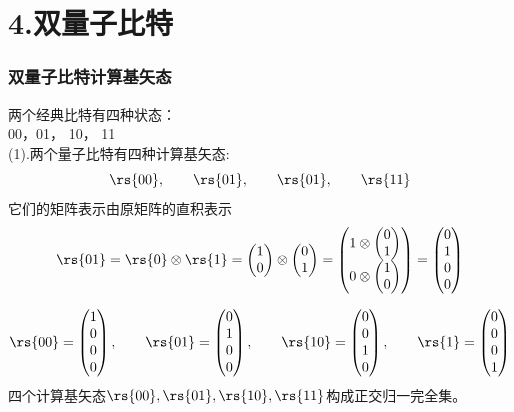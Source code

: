 \section{4.双量子比特}


\begin{frame} 
\frametitle{双量子比特计算基矢态}
两个经典比特有四种状态：\\
00，01， 10， 11\\
(1).两个量子比特有四种计算基矢态:
\[\rs{00}, \qquad \rs{01}, \qquad \rs{01}, \qquad \rs{11} \] 
它们的矩阵表示由原矩阵的直积表示 
\[\rs{01} = \rs{0} \otimes \rs{1} =    
\begin{pmatrix}
    1\\
    0
\end{pmatrix}
\otimes
\begin{pmatrix}
    0\\
    1
\end{pmatrix}
=
\begin{pmatrix}
    1 \otimes \begin{pmatrix}
        0\\
        1
    \end{pmatrix}\\
    0 \otimes \begin{pmatrix}
        1\\
        0
    \end{pmatrix}
\end{pmatrix}
=
\begin{pmatrix}
    0\\
    1\\
    0\\
    0
\end{pmatrix}
 \] 

\end{frame}

\begin{frame} 
\[
\rs{00} = 
\begin{pmatrix}
    1\\
    0\\
    0\\
    0
\end{pmatrix},\qquad
\rs{01} = 
\begin{pmatrix}
    0\\
    1\\
    0\\
    0
\end{pmatrix},\qquad
\rs{10} = 
\begin{pmatrix}
    0\\
    0\\
    1\\
    0
\end{pmatrix},\qquad
\rs{1} = 
\begin{pmatrix}
    0\\
    0\\
    0\\
    1
\end{pmatrix}
\] \vspace{0.6em}
\Note 四个计算基矢态$ \rs{00}, \rs{01},\rs{10},\rs{11} $构成正交归一完全集。
\end{frame}

